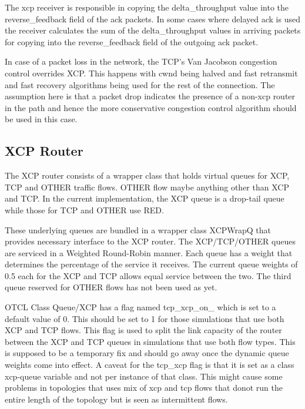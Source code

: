     The xcp receiver is responsible in copying the delta\_throughput
    value into the reverse\_feedback field of the ack packets. In some
    cases where delayed ack is used the receiver calculates the sum of
    the delta\_throughput values in arriving packets for copying into the
    reverse\_feedback field of the outgoing ack packet.

    In case of a packet loss in the network, the TCP's Van Jacobson
    congestion control overrides XCP. This happens with cwnd being
    halved and fast retransmit and fast recovery algorithms being used
    for the rest of the connection. The assumption here is that a packet
    drop indicates the presence of a non-xcp router in the path and
    hence the more conservative congestion control algorithm should be
    used in this case. 

    \subsection{XCP Router}
    \label {sec:xcp_wrapper}
    The XCP router consists of a wrapper class that holds virtual queues
    for XCP, TCP and OTHER traffic flows. OTHER flow maybe anything other
    than XCP and TCP. In the current implementation, the XCP queue is a
    drop-tail queue while those for TCP and OTHER use RED. 

    These underlying queues are bundled in a
    wrapper class XCPWrapQ that provides necessary interface to the XCP
    router. The XCP/TCP/OTHER queues are serviced in a Weighted Round-Robin
    manner. Each queue has a weight that determines the percentage of the
    service it receives. The current queue weights of 0.5 each for the XCP
    and TCP allows equal service between the two. The third queue reserved
    for OTHER flows has not been used as yet. 
    
    OTCL Class Queue/XCP has a flag named tcp\_xcp\_on\_ which is set to
    a default 
    value of 0. This should be set to 1 for those simulations that use
    both XCP and TCP flows. This flag is used to split the link capacity
    of the router between the XCP and TCP queues in simulations that
    use both flow types. This is supposed to be a temporary fix and
    should go away once the dynamic queue weights come into effect. A
    caveat for the tcp\_xcp flag is that it is set as a class xcp-queue
    variable and not per instance of that class. This might cause some
    problems in 
    topologies that uses mix of xcp and tcp flows that donot run the
    entire length of the topology but is seen as intermittent flows.
    
